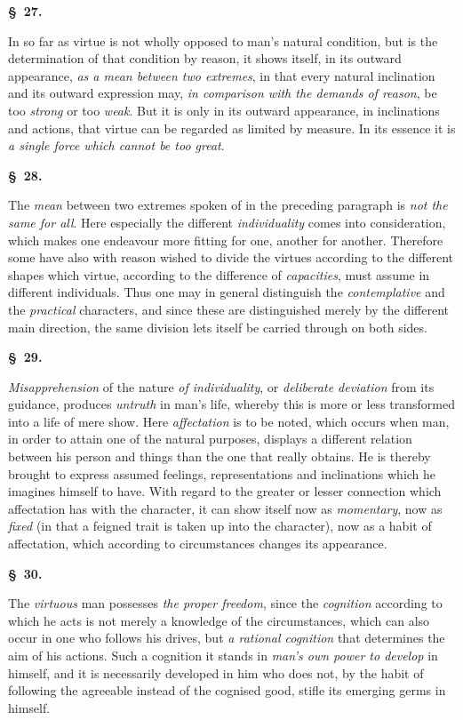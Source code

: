 \documentclass[12pt]{article}
\newcommand{\opage}[1]{\marginnote{\footnotesize\textit{[#1]}}}
\newcommand{\slaw}[1]{\par\medskip\begin{center}\textbf{\S~#1.}\end{center}\nopagebreak}
\begin{document}
\slaw{27}
In so far as virtue is not wholly opposed to man's natural condition, but is the determination of that condition by reason, it shows itself, in its outward appearance, \emph{as a mean between two extremes}, in that every natural inclination and its outward expression may, \emph{in comparison with the demands of reason}, be too \emph{strong} or too \emph{weak}. But it is only in its outward appearance, in inclinations and actions, that virtue can be regarded as limited by measure. In its essence it is \emph{a single force which cannot be too great}.

\slaw{28}
The \emph{mean} between two extremes spoken of in the preceding paragraph is \emph{not the same for all}. Here especially the different \emph{individuality} comes into consideration, which makes one en\opage{155}deavour more fitting for one, another for another. Therefore some have also with reason wished to divide the virtues according to the different shapes which virtue, according to the difference of \emph{capacities}, must assume in different individuals. Thus one may in general distinguish the \emph{contemplative} and the \emph{practical} characters, and since these are distinguished merely by the different main direction, the same division lets itself be carried through on both sides.

\slaw{29}
\emph{Misapprehension} of the nature \emph{of individuality}, or \emph{deliberate deviation} from its guidance, produces \emph{untruth} in man's life, whereby this is more or less transformed into a life of mere show. Here \emph{affectation} is to be noted, which occurs when man, in order to attain one of the natural purposes, displays a different relation between his person and things than the one that really obtains. He is thereby brought to express assumed feelings, representations and inclinations which he imagines himself to have. With regard to the greater or lesser connection which affectation has with the character, it can show itself now as \emph{momentary}, now as \emph{fixed} (in that a feigned trait is taken up into the character), now as a habit of affectation, which according to circumstances changes its appearance.

\slaw{30}
The \emph{virtuous} man possesses \emph{the proper freedom}, since the \emph{cognition} according to which he acts is not merely a knowledge of the circumstances, which can also occur in one who follows his drives, but \emph{a rational cognition} that determines the aim of his actions. Such a cognition it stands in \emph{man's own power to develop} in himself, and it is necessarily developed in him who does not, by the habit of following the agreeable instead of the cognised good, stifle its emerging germs in himself.
\end{document}
